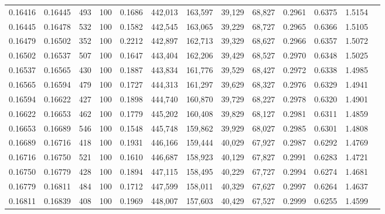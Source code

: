 \begin{tabular}{rrrrrrrrrrrrr}
0.16416 & 0.16445 &   493 & 100 &                                     0.1686 & 442,013 & 163,597 &  39,129 &  68,827 & 0.2961 & 0.6375 & 1.5154 \\
0.16445 & 0.16478 &   532 & 100 &                                     0.1582 & 442,545 & 163,065 &  39,229 &  68,727 & 0.2965 & 0.6366 & 1.5105 \\
0.16479 & 0.16502 &   352 & 100 &                                     0.2212 & 442,897 & 162,713 &  39,329 &  68,627 & 0.2966 & 0.6357 & 1.5072 \\
0.16502 & 0.16537 &   507 & 100 &                                     0.1647 & 443,404 & 162,206 &  39,429 &  68,527 & 0.2970 & 0.6348 & 1.5025 \\
0.16537 & 0.16565 &   430 & 100 &                                     0.1887 & 443,834 & 161,776 &  39,529 &  68,427 & 0.2972 & 0.6338 & 1.4985 \\
0.16565 & 0.16594 &   479 & 100 &                                     0.1727 & 444,313 & 161,297 &  39,629 &  68,327 & 0.2976 & 0.6329 & 1.4941 \\
0.16594 & 0.16622 &   427 & 100 &                                     0.1898 & 444,740 & 160,870 &  39,729 &  68,227 & 0.2978 & 0.6320 & 1.4901 \\
0.16622 & 0.16653 &   462 & 100 &                                     0.1779 & 445,202 & 160,408 &  39,829 &  68,127 & 0.2981 & 0.6311 & 1.4859 \\
0.16653 & 0.16689 &   546 & 100 &                                     0.1548 & 445,748 & 159,862 &  39,929 &  68,027 & 0.2985 & 0.6301 & 1.4808 \\
0.16689 & 0.16716 &   418 & 100 &                                     0.1931 & 446,166 & 159,444 &  40,029 &  67,927 & 0.2987 & 0.6292 & 1.4769 \\
0.16716 & 0.16750 &   521 & 100 &                                     0.1610 & 446,687 & 158,923 &  40,129 &  67,827 & 0.2991 & 0.6283 & 1.4721 \\
0.16750 & 0.16779 &   428 & 100 &                                     0.1894 & 447,115 & 158,495 &  40,229 &  67,727 & 0.2994 & 0.6274 & 1.4681 \\
0.16779 & 0.16811 &   484 & 100 &                                     0.1712 & 447,599 & 158,011 &  40,329 &  67,627 & 0.2997 & 0.6264 & 1.4637 \\
0.16811 & 0.16839 &   408 & 100 &                                     0.1969 & 448,007 & 157,603 &  40,429 &  67,527 & 0.2999 & 0.6255 & 1.4599 \\

\end{tabular}
